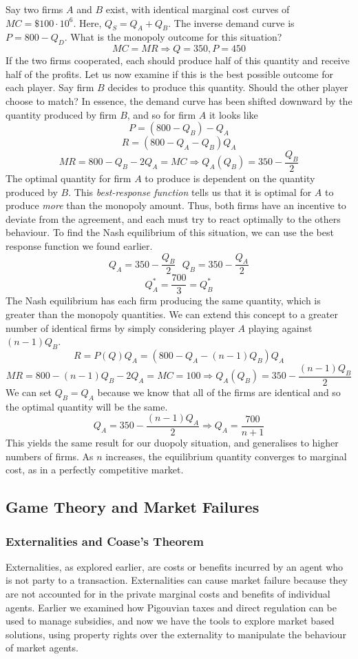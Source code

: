 \documentclass[12pt]{report}
\begin{document}
\begin{flushleft}
\bigskip
Say two firms \(A\) and \(B\) exist, with identical marginal cost curves of 
\(MC = \$100\cdot10^6\). Here, \(Q_S = Q_A + Q_B\). The inverse demand curve is
\(P = 800 - Q_D\). What is the monopoly outcome for this situation?
\[MC = MR \Rightarrow Q = 350, P = 450\]
If the two firms cooperated, each should produce half of this quantity and 
receive half of the profits. Let us now examine if this is the best possible
outcome for each player. Say firm \(B\) decides to produce this quantity.
Should the other player choose to match? In essence, the demand curve has been
shifted downward by the quantity produced by firm \(B\), and so for firm \(A\)
it looks like 
\[P = (800 - Q_B) - Q_A\]
\[R = (800 - Q_A - Q_B)Q_A\]
\[MR = 800 - Q_B - 2Q_A = MC \Rightarrow Q_A(Q_B) = 350 - \frac{Q_B}{2}\]
The optimal quantity for firm \(A\) to produce is dependent on the quantity
produced by \(B\). This \textit{best-response function} tells us that it is
optimal for \(A\) to produce \textit{more} than the monopoly amount. Thus, both
firms have an incentive to deviate from the agreement, and each must try to 
react optimally to the others behaviour. To find the Nash equilibrium of this
situation, we can use the best response function we found earlier.
\[Q_A = 350 - \frac{Q_B}{2} \:\:\: Q_B = 350 - \frac{Q_A}{2}\]
\[Q_A^* = \frac{700}{3} = Q_B^*\]
The Nash equilibrium has each firm producing the same quantity, which is 
greater than the monopoly quantities. We can extend this concept to a greater
number of identical firms by simply considering player \(A\) playing against
\((n - 1)Q_B\). 
\[R = P(Q)Q_A = (800 - Q_A - (n - 1)Q_B)Q_A\]
\[MR = 800 - (n - 1)Q_B - 2Q_A = MC = 100 \Rightarrow 
Q_A(Q_B) = 350 - \frac{(n - 1)Q_B}{2}\]
We can set \(Q_B = Q_A\) because we know that all of the firms are identical 
and so the optimal quantity will be the same.
\[Q_A = 350 - \frac{(n - 1)Q_A}{2} \Rightarrow Q_A = \frac{700}{n + 1}\]
This yields the same result for our duopoly situation, and generalises to
higher numbers of firms. As \(n\) increases, the equilibrium quantity converges
to marginal cost, as in a perfectly competitive market.

\subsection*{Game Theory and Market Failures}

\subsubsection*{Externalities and Coase's Theorem}
Externalities, as explored earlier, are costs or benefits incurred by an agent
who is not party to a transaction. Externalities can cause market failure 
because they are not accounted for in the private marginal costs and benefits
of individual agents. Earlier we examined how Pigouvian taxes and direct
regulation can be used to manage subsidies, and now we have the tools to 
explore market based solutions, using property rights over the externality to
manipulate the behaviour of market agents.


\end{flushleft}
\end{document}
